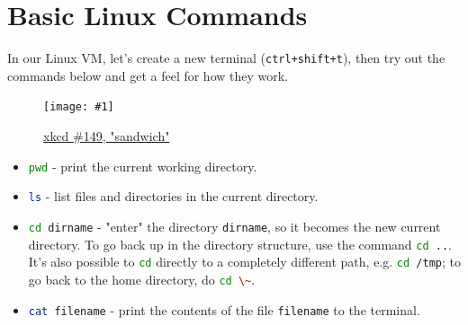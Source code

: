 \documentclass{article}
\newcommand{\wrapimagerightcap}[2] {
    \begin{figure}\begin{center}\texttt{[image: \#1]}\end{center}\caption{#2}\end{figure}}
\newcommand{\xcode}[2]{\colorbox{ubuntuback}{\lstinline[language=#1]|#2|}}
\newcommand{\code}[1]{\colorbox{ubuntuback}{\texttt{#1}}}
\begin{document}
\section{Basic Linux Commands}


In our Linux VM, let's create a new terminal (\code{ctrl+shift+t}), then try out the commands below and get a feel for how they work.

\wrapimagerightcap{./images/sandwich.png}{\href{https://xkcd.com/149/}{xkcd \#149, "sandwich"}} 

\begin{itemize}
    \item \xcode{bash}{pwd} - print the current working directory.
    \item \xcode{bash}{ls} - list files and directories in the current directory.
    \item \xcode{bash}{cd dirname} - "enter" the directory \code{dirname}, so it becomes the new current directory. To go back up in the directory structure, use the command \xcode{bash}{cd ..}. It's also possible to \xcode{bash}{cd} directly to a completely different path, e.g. \xcode{bash}{cd /tmp}; to go back to the home directory, do \xcode{bash}{cd \~}.
    \item \xcode{bash}{cat filename} - print the contents of the file \code{filename} to the terminal. 


\end{itemize}
\end{document}
